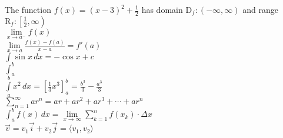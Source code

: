 \documentclass[12pt]{article}
\begin{document}
The function $f(x)=(x-3)^2+\frac{1}{2}$ has domain $\mathrm{D}_f:(-\infty,\infty)$ and range $\mathrm{R}_f:\left[\frac{1}{2},\infty \right)$\\

$\lim \limits_{x \to a^-}f(x)$\\

$\displaystyle{\lim \limits_{x \to a} \frac{f(x)-f(a)}{x-a}=f'(a)}$\\

$\displaystyle{\int \sin x \, dx=-\cos x+c}$\\

$\int_a^b$\\

$\displaystyle{\int	\limits_a^b}x^2\,dx=\left[\frac{1}{3}x^3\right]_a^b=\frac{b^3}{3}-\frac{a^3}{3}$\\

$\displaystyle{\sum \limits_{n=1} ^ \infty}ar^n=ar+ar^2+ar^3+\cdots+ar^n$\\

$\displaystyle{\int_a^bf(x)\,dx=\lim \limits_{x \to \infty} \sum \limits_{k=1}^{n} f(x_k) \cdot \Delta x}$\\

$\vec{v}=v_1\vec{i}+v_2 \vec{j}=\langle v_1,v_2\rangle$
\end{document}
